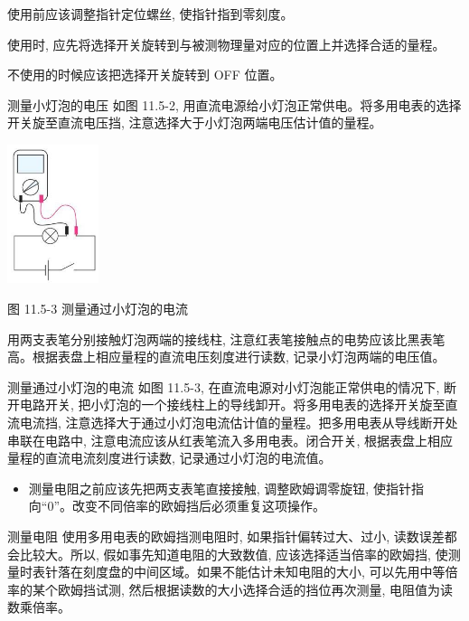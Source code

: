 \documentclass[10pt]{article}
\begin{document}
使用前应该调整指针定位螺丝, 使指针指到零刻度。

使用时, 应先将选择开关旋转到与被测物理量对应的位置上并选择合适的量程。

不使用的时候应该把选择开关旋转到 OFF 位置。

测量小灯泡的电压 如图 11.5-2, 用直流电源给小灯泡正常供电。将多用电表的选择开关旋至直流电压挡, 注意选择大于小灯泡两端电压估计值的量程。

\begin{center}
\includegraphics[max width=0.2\textwidth]{images/01911d5f-8e38-70c0-b5b8-2b399bd115b6_78_485268.jpg}
\end{center}

图 11.5-3 测量通过小灯泡的电流

用两支表笔分别接触灯泡两端的接线柱, 注意红表笔接触点的电势应该比黑表笔高。根据表盘上相应量程的直流电压刻度进行读数, 记录小灯泡两端的电压值。

测量通过小灯泡的电流 如图 11.5-3, 在直流电源对小灯泡能正常供电的情况下, 断开电路开关, 把小灯泡的一个接线柱上的导线卸开。将多用电表的选择开关旋至直流电流挡, 注意选择大于通过小灯泡电流估计值的量程。把多用电表从导线断开处串联在电路中, 注意电流应该从红表笔流入多用电表。闭合开关, 根据表盘上相应量程的直流电流刻度进行读数, 记录通过小灯泡的电流值。

\begin{mdframed}

\begin{itemize}
\item 测量电阻之前应该先把两支表笔直接接触, 调整欧姆调零旋钮, 使指针指向“0”。改变不同倍率的欧姆挡后必须重复这项操作。
\end{itemize}

\end{mdframed}

测量电阻 使用多用电表的欧姆挡测电阻时, 如果指针偏转过大、过小, 读数误差都会比较大。所以, 假如事先知道电阻的大致数值, 应该选择适当倍率的欧姆挡, 使测量时表针落在刻度盘的中间区域。如果不能估计未知电阻的大小, 可以先用中等倍率的某个欧姆挡试测, 然后根据读数的大小选择合适的挡位再次测量, 电阻值为读数乘倍率。
\end{document}
